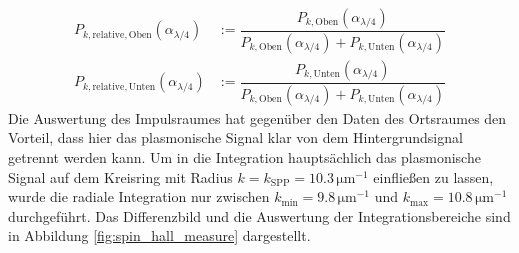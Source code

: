 \documentclass[titlepage,  ngerman]{article}
\begin{document}
		\begin{align}
			\label{eq:relative_power_momentum}
			P_{k, \mathrm{relative}, \mathrm{Oben}}(\alpha_{\lambda/4}) &:= 	\dfrac{P_{k, \mathrm{Oben}}(\alpha_{\lambda/4})}{P_{k, \mathrm{Oben}}(\alpha_{\lambda/4}) + P_{k, \mathrm{Unten}}(\alpha_{\lambda/4})} \\
			\nonumber
			P_{k, \mathrm{relative}, \mathrm{Unten}}(\alpha_{\lambda/4}) &:= 	\dfrac{P_{k, \mathrm{Unten}}(\alpha_{\lambda/4})}{P_{k, \mathrm{Oben}}(\alpha_{\lambda/4}) + P_{k, \mathrm{Unten}}(\alpha_{\lambda/4})}	 	
		\end{align}
		Die Auswertung des Impulsraumes hat gegenüber den Daten des Ortsraumes den Vorteil, dass hier das plasmonische Signal klar von dem Hintergrundsignal getrennt werden kann. Um in die Integration hauptsächlich das plasmonische Signal auf dem Kreisring mit Radius $k = k_\mathrm{SPP} = 10.3\,\mathrm{\mu m}^{-1}$ einfließen zu lassen, wurde die radiale Integration nur zwischen $k_\mathrm{min} = 9.8\,\mathrm{\mu m}^{-1}$ und $k_\mathrm{max} = 10.8\,\mathrm{\mu m}^{-1}$ durchgeführt. Das Differenzbild und die Auswertung der Integrationsbereiche sind in Abbildung \ref{fig:spin_hall_measure} dargestellt.		
\end{document}
